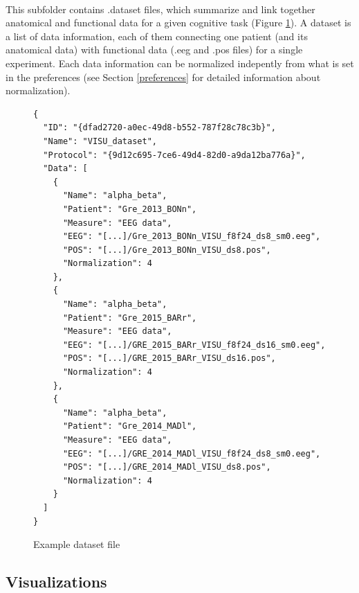 \documentclass[a4paper]{article}
\begin{document}
\paragraph{} This subfolder contains .dataset files, which summarize and link together anatomical and functional data for a given cognitive task (Figure \ref{datasetFile}).
A dataset is a list of data information, each of them connecting one patient (and its anatomical data) with functional data (.eeg and .pos files) for a single experiment. Each data information can be normalized indepently from what is set in the preferences (see Section \ref{preferences} for detailed information about normalization).
\begin{figure}[H]
\begin{lstlisting}
{
  "ID": "{dfad2720-a0ec-49d8-b552-787f28c78c3b}",
  "Name": "VISU_dataset",
  "Protocol": "{9d12c695-7ce6-49d4-82d0-a9da12ba776a}",
  "Data": [
    {
      "Name": "alpha_beta",
      "Patient": "Gre_2013_BONn",
      "Measure": "EEG data",
      "EEG": "[...]/Gre_2013_BONn_VISU_f8f24_ds8_sm0.eeg",
      "POS": "[...]/Gre_2013_BONn_VISU_ds8.pos",
      "Normalization": 4
    },
    {
      "Name": "alpha_beta",
      "Patient": "Gre_2015_BARr",
      "Measure": "EEG data",
      "EEG": "[...]/GRE_2015_BARr_VISU_f8f24_ds16_sm0.eeg",
      "POS": "[...]/GRE_2015_BARr_VISU_ds16.pos",
      "Normalization": 4
    },
    {
      "Name": "alpha_beta",
      "Patient": "Gre_2014_MADl",
      "Measure": "EEG data",
      "EEG": "[...]/GRE_2014_MADl_VISU_f8f24_ds8_sm0.eeg",
      "POS": "[...]/GRE_2014_MADl_VISU_ds8.pos",
      "Normalization": 4
    }
  ]
}
\end{lstlisting}
\caption{\label{datasetFile}Example dataset file}
\end{figure}
\subsection{Visualizations}
\end{document}
